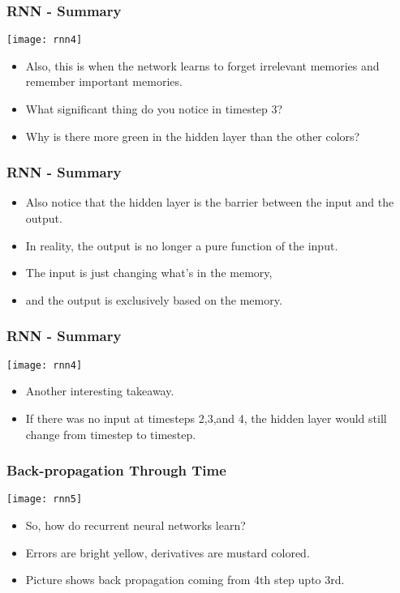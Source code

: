 \begin{frame}[fragile] \frametitle{RNN - Summary}
\begin{center}
\texttt{[image: rnn4]}
\end{center}
\begin{itemize}
\item Also, this is when the network learns to forget irrelevant memories and remember important memories. 
\item What significant thing do you notice in timestep 3? 
\item Why is there more green in the hidden layer than the other colors?
\end{itemize}
\end{frame}

\begin{frame}[fragile] \frametitle{RNN - Summary}
\begin{itemize}
\item Also notice that the hidden layer is the barrier between the input and the output. 
\item In reality, the output is no longer a pure function of the input. 
\item The input is just changing what's in the memory, 
\item and the output is exclusively based on the memory. 
\end{itemize}
\end{frame}

\begin{frame}[fragile] \frametitle{RNN - Summary}
\begin{center}
\texttt{[image: rnn4]}
\end{center}
\begin{itemize}
\item Another interesting takeaway. 
\item If there was no input at timesteps 2,3,and 4, the hidden layer would still change from timestep to timestep. 
\end{itemize}
\end{frame}

\begin{frame}[fragile] \frametitle{Back-propagation Through Time}
\begin{center}
\texttt{[image: rnn5]}
\end{center}
\begin{itemize}
\item So, how do recurrent neural networks learn? 
\item Errors are bright yellow, derivatives are mustard colored.
\item Picture shows back propagation coming from 4th step upto 3rd.
\end{itemize}
\end{frame}

